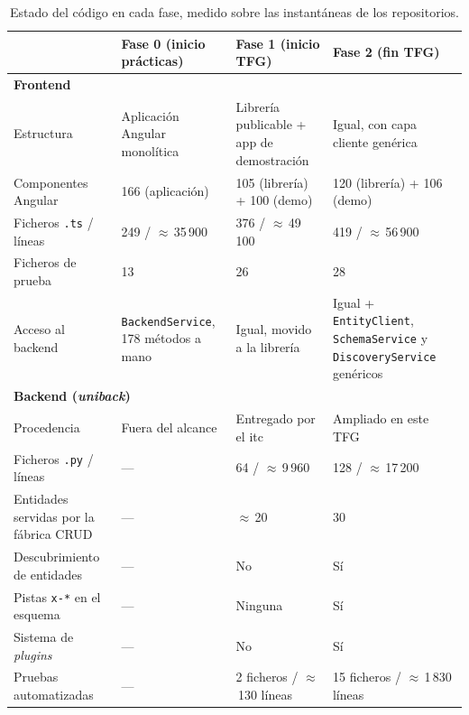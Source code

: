 \begin{table}[!htbp]
\caption{Estado del código en cada fase, medido sobre las instantáneas de los repositorios.}
\label{tab:fases}
\centering
\footnotesize
\begin{tabular}{|p{3.9cm}|p{3.4cm}|p{3.4cm}|p{3.4cm}|}
\hline
 & \textbf{Fase 0} \newline (inicio prácticas) & \textbf{Fase 1} \newline (inicio TFG) & \textbf{Fase 2} \newline (fin TFG) \\ \hline
\multicolumn{4}{|l|}{\textbf{Frontend}} \\ \hline
Estructura & Aplicación Angular monolítica & Librería publicable + app de demostración & Igual, con capa cliente genérica \\ \hline
Componentes Angular & 166 (aplicación) & 105 (librería) + 100 (demo) & 120 (librería) + 106 (demo) \\ \hline
Ficheros \texttt{.ts} / líneas & 249 / $\approx$\,35\,900 & 376 / $\approx$\,49\,100 & 419 / $\approx$\,56\,900 \\ \hline
Ficheros de prueba & 13 & 26 & 28 \\ \hline
Acceso al backend & \texttt{BackendService}, 178 métodos a mano & Igual, movido a la librería & Igual + \texttt{EntityClient}, \texttt{SchemaService} y \texttt{DiscoveryService} genéricos \\ \hline
\multicolumn{4}{|l|}{\textbf{Backend (\emph{uniback})}} \\ \hline
Procedencia & Fuera del alcance & Entregado por el \gls{itc} & Ampliado en este TFG \\ \hline
Ficheros \texttt{.py} / líneas & --- & 64 / $\approx$\,9\,960 & 128 / $\approx$\,17\,200 \\ \hline
Entidades servidas por la fábrica CRUD & --- & $\approx$\,20 & 30 \\ \hline
Descubrimiento de entidades & --- & No & Sí \\ \hline
Pistas \texttt{x-*} en el esquema & --- & Ninguna & Sí \\ \hline
Sistema de \emph{plugins} & --- & No & Sí \\ \hline
Pruebas automatizadas & --- & 2 ficheros / $\approx$\,130 líneas & 15 ficheros / $\approx$\,1\,830 líneas \\ \hline
\end{tabular}
\end{table}

